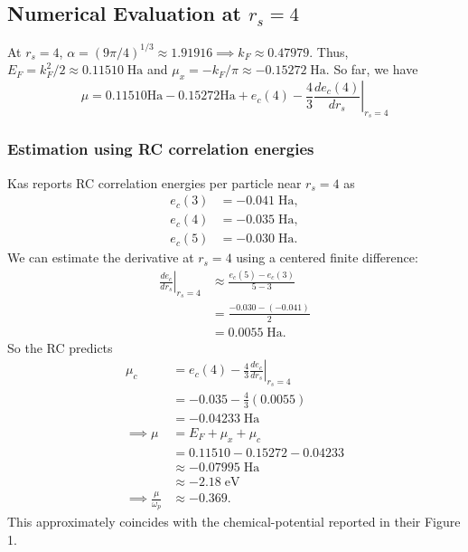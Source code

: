 \subsection{Numerical Evaluation at $r_s=4$}
At $r_s=4$, $\alpha=\left(9\pi/4\right)^{1/3}\approx 1.91916 \implies k_F\approx 0.47979$. Thus, $E_F=k_F^2/2\approx 0.11510\;\mathrm{Ha}$ and $\mu_x=-k_F/\pi\approx -0.15272\;\mathrm{Ha}$. So far, we have
\begin{equation}
    \mu = 0.11510 \mathrm{Ha} - 0.15272 \mathrm{Ha} +
    e_c(4)
    -
    \frac{4}{3}
   \left. \frac{de_c(4)}{dr_s}\right|_{r_s=4}
\end{equation}
\subsubsection{Estimation using RC correlation energies}
Kas reports
RC correlation energies per particle near $r_s=4$ as
\begin{align}
    e_c(3) &= -0.041\;\mathrm{Ha},
    \\
    e_c(4) &= -0.035\;\mathrm{Ha},
    \\
    e_c(5) &= -0.030\;\mathrm{Ha}.
\end{align}
We can estimate the derivative at $r_s=4$ using a centered finite
difference:
\begin{align}
    \left.
    \frac{de_c}{dr_s}
    \right|_{r_s=4}
    &\approx
    \frac{e_c(5)-e_c(3)}{5-3}
    \\
    &=
    \frac{-0.030-(-0.041)}{2}
    \\
    &=
    0.0055\;\mathrm{Ha}.
\end{align}
So the RC predicts
\begin{align}
    \mu_c
    &=
    e_c(4)
    -
    \frac{4}{3}
    \left.
    \frac{de_c}{dr_s}
    \right|_{r_s=4}
    \\
    &=
    -0.035
    -
    \frac{4}{3}(0.0055)
    \\
    &=
    -0.04233\;\mathrm{Ha}\\
\implies    \mu
    &=
    E_F+\mu_x+\mu_c
    \\
    &=
    0.11510
    -
    0.15272
    -
    0.04233
    \\
    &\approx
    -0.07995\;\mathrm{Ha}\\
    &\approx
    {-2.18\;\mathrm{eV}}\\
   \implies \frac{\mu}{\omega_p}
    &\approx {-0.369}.
\end{align}
This approximately coincides with the chemical-potential reported in their Figure 1.
